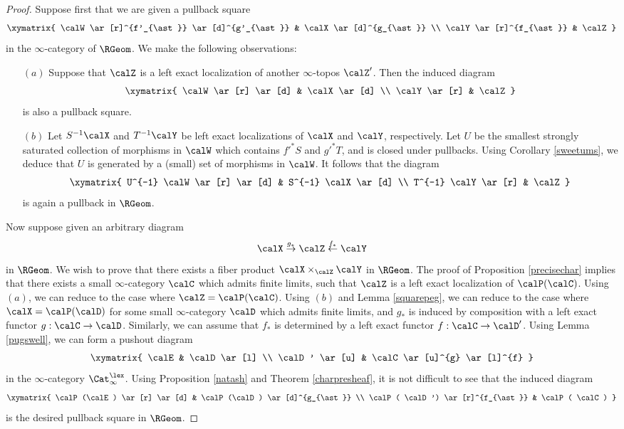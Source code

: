 \begin{proof}
Suppose first that we are given a pullback square
$$ \xymatrix{ \calW \ar[r]^{f'_{\ast}} \ar[d]^{g'_{\ast}} & \calX \ar[d]^{g_{\ast}} \\
\calY \ar[r]^{f_{\ast}} & \calZ }$$
in the $\infty$-category of $\RGeom$. We make the following observations:

\begin{itemize}
\item[$(a)$] Suppose that $\calZ$ is a left exact localization of another $\infty$-topos $\calZ'$. Then the induced diagram
$$ \xymatrix{ \calW \ar[r] \ar[d] & \calX \ar[d] \\
\calY \ar[r] & \calZ }$$
is also a pullback square.

\item[$(b)$] Let $S^{-1} \calX$ and $T^{-1} \calY$ be left exact localizations of $\calX$ and $\calY$, respectively. Let $U$ be the smallest strongly saturated collection of morphisms in
$\calW$ which contains ${f'}^{\ast} S$ and ${g'}^{\ast} T$, and is closed under pullbacks. Using Corollary \ref{sweetums}, we deduce that $U$ is generated by a (small) set of morphisms in $\calW$. It follows that the diagram
$$ \xymatrix{ U^{-1} \calW \ar[r] \ar[d] & S^{-1} \calX \ar[d] \\
T^{-1} \calY \ar[r] & \calZ }$$
is again a pullback in $\RGeom$.
\end{itemize}

Now suppose given an arbitrary diagram
$$ \calX \stackrel{g_{\ast} }{\rightarrow} \calZ \stackrel{f_{\ast}}{\leftarrow} \calY$$
in $\RGeom$. We wish to prove that there exists a fiber product $\calX \times_{ \calZ} \calY$
in $\RGeom$. The proof of Proposition \ref{precisechar} implies that there exists
a small $\infty$-category $\calC$ which admits finite limits, such that
$\calZ$ is a left exact localization of $\calP(\calC)$. Using $(a)$, we can reduce to the case where $\calZ = \calP(\calC)$. Using $(b)$ and Lemma \ref{squarepeg}, we can reduce to the case where
$\calX = \calP(\calD)$ for some small $\infty$-category $\calD$ which admits finite limits, and $g_{\ast}$ is induced by composition with a left exact functor $g: \calC \rightarrow \calD$. Similarly, we can assume that $f_{\ast}$ is determined by a left exact functor $f: \calC \rightarrow \calD'$.
Using Lemma \ref{pugswell}, we can form a pushout diagram
$$ \xymatrix{ \calE & \calD \ar[l] \\
\calD' \ar[u] & \calC \ar[u]^{g} \ar[l]^{f} }$$
in the $\infty$-category $\Cat_{\infty}^{\lex}$. Using Proposition \ref{natash} and Theorem \ref{charpresheaf}, it is not difficult to see that the induced diagram
$$ \xymatrix{ \calP(\calE) \ar[r] \ar[d] & \calP(\calD) \ar[d]^{g_{\ast}} \\
\calP( \calD') \ar[r]^{f_{\ast}} & \calP( \calC) }$$
is the desired pullback square in $\RGeom$.
\end{proof}

